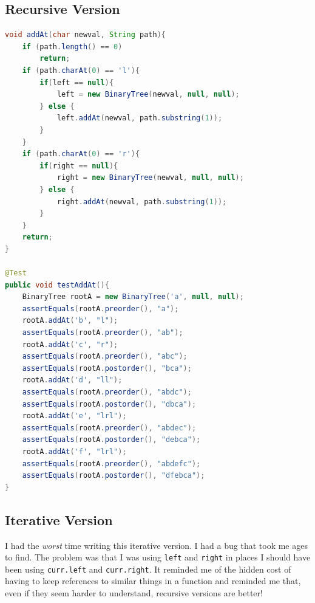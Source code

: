 \documentclass[twoside=false,DIV=14]{scrartcl}
\begin{document}
\subsection{Recursive Version}

\begin{lstlisting}[language=java]
void addAt(char newval, String path){
    if (path.length() == 0)
        return;
    if (path.charAt(0) == 'l'){
        if(left == null){
            left = new BinaryTree(newval, null, null);
        } else {
            left.addAt(newval, path.substring(1));
        }
    }
    if (path.charAt(0) == 'r'){
        if(right == null){
            right = new BinaryTree(newval, null, null);
        } else {
            right.addAt(newval, path.substring(1));
        }
    }
    return;
}

@Test
public void testAddAt(){
    BinaryTree rootA = new BinaryTree('a', null, null);
    assertEquals(rootA.preorder(), "a");
    rootA.addAt('b', "l");
    assertEquals(rootA.preorder(), "ab");
    rootA.addAt('c', "r");
    assertEquals(rootA.preorder(), "abc");
    assertEquals(rootA.postorder(), "bca");
    rootA.addAt('d', "ll");
    assertEquals(rootA.preorder(), "abdc");
    assertEquals(rootA.postorder(), "dbca");
    rootA.addAt('e', "lrl");
    assertEquals(rootA.preorder(), "abdec");
    assertEquals(rootA.postorder(), "debca");
    rootA.addAt('f', "lrl");
    assertEquals(rootA.preorder(), "abdefc");
    assertEquals(rootA.postorder(), "dfebca");
}

\end{lstlisting}

\subsection{Iterative Version}
I had the \emph{worst} time writing this iterative version. I had a bug that took me ages to find.  The problem was that I was using \verb+left+ and \verb+right+ in places I should have been using \verb+curr.left+ and \verb+curr.right+. It reminded me of the hidden cost of having to keep references to similar things in a function and reminded me that, even if they seem harder to understand, recursive versions are better!
\end{document}
